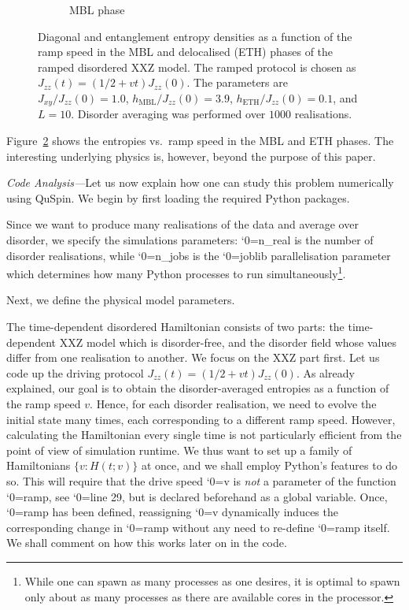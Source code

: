 \documentclass{SciPost}
\newcommand\0{\scalebox{-1}[1]{0}}
\let\svttfamily\ttfamily
\renewcommand\ttfamily{\svttfamily\catcode`0=\active }
\renewcommand\texttt{\bgroup\ttfamily\texttthelp}
\def\texttthelp#1{#1\egroup}
\begin{document}
\begin{figure}[t!]
\begin{subfigure}[b]{0.496\textwidth}
		\caption{MBL phase}
		\label{fig:tiger}
	\end{subfigure}
	\caption{\label{fig:example1} Diagonal and entanglement entropy densities as a function of the ramp speed in the MBL and delocalised (ETH) phases of the ramped disordered XXZ model. The ramped protocol is chosen as $J_{zz}(t) = (1/2 + vt)J_{zz}(0)$. The parameters are $J_{xy}/J_{zz}(0)=1.0$, $h_\mathrm{MBL}/J_{zz}(0)=3.9$, $h_\mathrm{ETH}/J_{zz}(0)=0.1$, and $L=10$. Disorder averaging was performed over $1000$ realisations.}  
\end{figure}
Figure~\ref{fig:example1} shows the entropies vs.~ramp speed in the MBL and ETH phases. The interesting underlying physics is, however, beyond the purpose of this paper.


\emph{Code Analysis---}Let us now explain how one can study this problem numerically using QuSpin. We begin by first loading the required Python packages. 

%
Since we want to produce many realisations of the data and average over disorder, we specify the simulations parameters: \texttt{n\_real} is the number of disorder realisations, while \texttt{n\_jobs} is the \texttt{joblib} parallelisation parameter which determines how many Python processes to run simultaneously\footnote{While one can spawn as many processes as one desires, it is optimal to spawn only about as many processes as there are available cores in the processor.}.

%
Next, we define the physical model parameters.  

%
The time-dependent disordered Hamiltonian consists of two parts: the time-dependent XXZ model which is disorder-free, and the disorder field whose values differ from one realisation to another. We focus on the XXZ part first. Let us code up the driving protocol $J_{zz}(t) = (1/2 + vt)J_{zz}(0)$. As already explained, our goal is to obtain the disorder-averaged entropies as a function of the ramp speed $v$. Hence, for each disorder realisation, we need to evolve the initial state many times, each corresponding to a different ramp speed. However, calculating the Hamiltonian every single time is not particularly efficient from the point of view of simulation runtime. We thus want to set up a family of Hamiltonians $\{v:H(t;v)\}$ at once, and we shall employ Python's features to do so. This will require that the drive speed \texttt{v} is \emph{not} a parameter of the function \texttt{ramp}, see \texttt{line 29}, but is declared beforehand as a global variable. Once, \texttt{ramp} has been defined, reassigning \texttt{v} dynamically induces the corresponding change in \texttt{ramp} without any need to re-define \texttt{ramp} itself. We shall comment on how this works later on in the code.   
\end{document}
